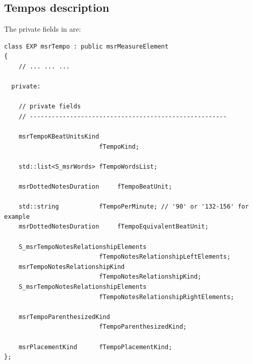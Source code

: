 \subsection{Tempos description}\label{Tempos description}

The private fields in  are:
\begin{lstlisting}[language=CPlusPlus]
class EXP msrTempo : public msrMeasureElement
{
	// ... ... ...

  private:

    // private fields
    // ------------------------------------------------------

    msrTempoKBeatUnitsKind
                          fTempoKind;

    std::list<S_msrWords> fTempoWordsList;

    msrDottedNotesDuration     fTempoBeatUnit;

    std::string           fTempoPerMinute; // '90' or '132-156' for example
    msrDottedNotesDuration     fTempoEquivalentBeatUnit;

    S_msrTempoNotesRelationshipElements
                          fTempoNotesRelationshipLeftElements;
    msrTempoNotesRelationshipKind
                          fTempoNotesRelationshipKind;
    S_msrTempoNotesRelationshipElements
                          fTempoNotesRelationshipRightElements;

    msrTempoParenthesizedKind
                          fTempoParenthesizedKind;

    msrPlacementKind      fTempoPlacementKind;
};
\end{lstlisting}

